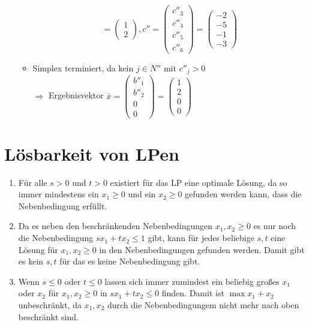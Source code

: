\documentclass[a4paper,10pt]{article}
\begin{document}
\begin{enumerate}
\begin{itemize}
\[                   = \begin{pmatrix}1 \\ 2\end{pmatrix},
                 c'' = \begin{pmatrix}c''_3 \\ c''_4 \\ c''_5 \\ c''_6\end{pmatrix} 
                   = \begin{pmatrix}-2 \\ -5 \\ -1 \\ -3 \end{pmatrix}
                \]
        \item   Simplex terminiert, da kein $j \in N''$ mit $c''_j > 0$\\
                $\Rightarrow$ Ergebnisvektor $\bar x = \begin{pmatrix}b''_1 \\ b''_2 \\ 0 \\ 0\end{pmatrix} = \begin{pmatrix}1 \\ 2 \\ 0 \\ 0\end{pmatrix}$
        \end{itemize}
\end{enumerate}

\section{Lösbarkeit von LPen}
\begin{enumerate}
\item   Für alle $s > 0$ und $t > 0$ existiert für das LP eine optimale Lösung, da so immer mindestens ein $x_1 \geq 0$ und ein $x_2 \geq 0$ gefunden werden kann, dass die Nebenbedingung erfüllt.
\item   Da es neben den beschränkenden Nebenbedingungen $x_1, x_2 \geq 0$ es nur noch die Nebenbedingung $sx_1 + tx_2 \leq 1$ gibt, kann für jedes beliebige $s, t$ eine Lösung für $x_1, x_2 \geq 0$ in den Nebenbedingungen gefunden werden. Damit gibt es kein $s,t$ für das es keine Nebenbedingung gibt. 
\item   Wenn $s \leq 0$ oder $t \leq 0$ lassen sich immer zumindest ein beliebig großes $x_1$ oder $x_2$ für $x_1, x_2 \geq 0$ in 
        $sx_1 + tx_2 \leq 0$ finden. Damit ist $\max x_1 + x_2$ unbeschränkt, 
        da $x_1, x_2$ durch die Nebenbedingungem nicht mehr nach oben beschränkt sind.
\end{enumerate}
\end{document}
